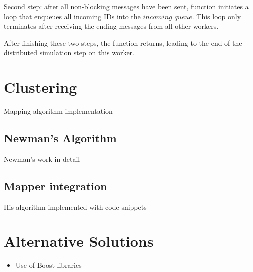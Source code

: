 Second step: after all non-blocking messages have been sent, function initiates a loop that enqueues all incoming IDs into the $incoming\_queue$. This loop only terminates after receiving the ending messages from all other workers.

After finishing these two steps, the function returns, leading to the end of the distributed simulation step on this worker.

\section{Clustering}

Mapping algorithm implementation

\subsection{Newman's Algorithm}

Newman's work in detail

\subsection{Mapper integration}

His algorithm implemented with code snippets

\section{Alternative Solutions}

\begin{itemize}
\item{Use of Boost libraries}
\end{itemize}
